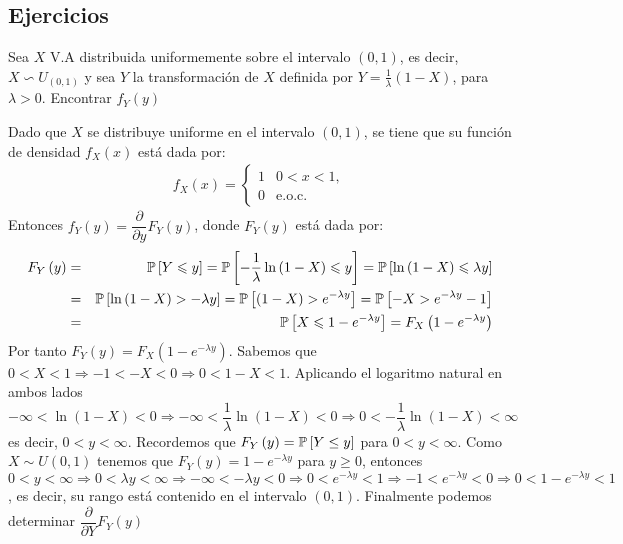 \subsection{Ejercicios}
\begin{Ejem}
Sea $X$ V.A distribuida uniformemente sobre el intervalo $ \left(0,1 \right)$, es decir,  $X \backsim U_{\left(0,1\right)}$ y sea $Y$ la transformaci\'on de $X$ definida por  $Y=\frac{1}{\lambda}\left( 1-X \right)$, 
para $\lambda > 0$. Encontrar $f_{Y}\left(y\right)$

Dado que $X$ se distribuye uniforme en el intervalo $\left(0,1 \right)$, se tiene que su funci\'on de densidad $ f_{X}\left(x\right)$ est\'a dada por: 
\begin{eqnarray*}
f_{X}\left(x\right) = \left\{
\begin{array}{cc}
1 & 0< x <1, \\
0 & \textrm {e.o.c.} 
\end{array}
\right.
\end{eqnarray*} 
 Entonces $f_{Y}\left( y \right)=\dfrac{\partial}{\partial y} F_{Y}\left(y \right)$, donde $F_{Y}\left(y \right)$ est\'a dada por:
\begin{eqnarray*}
F_{Y}\left( y \right) &=& \mathbb{P} \left[ Y \leqslant y \right]  = \mathbb{P} \left[-\dfrac{1}{\lambda}\ln \left( 1-X\right) \leqslant y \right] =\mathbb{P} \left[ \ln \left( 1-X \right) \leqslant \lambda y \right]\\
&=&\mathbb{P} \left[ \ln \left( 1-X \right) > - \lambda y \right] = \mathbb{P} \left[ \left( 1-X \right) > e^ {- \lambda y}\right] = \mathbb{P} \left[-X > e^ {-\lambda y} - 1 \right] \\
&=& \mathbb{P} \left[X \leqslant 1- e^{- \lambda y}\right] = F_{X}\left(1-e^{-\lambda y}\right)
\end{eqnarray*}
Por tanto $F_{Y}\left(y \right)=F_{X}\left(1-e^{-\lambda y}\right)$. Sabemos que $0<X<1 \Rightarrow -1< -X < 0 \Rightarrow 0 < 1-X < 1$.  Aplicando el logaritmo natural en ambos lados $-\infty < \ln \left(1-X\right) < 0\Rightarrow  -\infty < \dfrac{1}{\lambda} \ln \left(1-X\right) < 0\Rightarrow0 < - \dfrac{1}{\lambda}  \ln \left(1-X\right) <\infty $ es decir, $0<y<\infty$. Recordemos que $F_{Y} \left(y \right)= \mathbb{P} \left[Y \leq y \right]$ para $0 < y < \infty$. Como $X \sim U \left(0,1 \right)$ tenemos que 
$F_{Y}\left(y\right) =1-e^{-\lambda y}$ para $ y \geq 0$, entonces $0< y < \infty \Rightarrow0< \lambda y < \infty\Rightarrow- \infty < -\lambda y < 0\Rightarrow0<e ^{-\lambda y} < 1\Rightarrow-1<e^{-\lambda y} < 0\Rightarrow0<1 - e^{-\lambda y} < 1 $, es decir, su rango est\'a contenido en el intervalo  $ \left( 0,1 \right)$. Finalmente podemos determinar $\dfrac{\partial}{\partial Y} F_{Y} \left( y \right)$

\end{Ejem}
